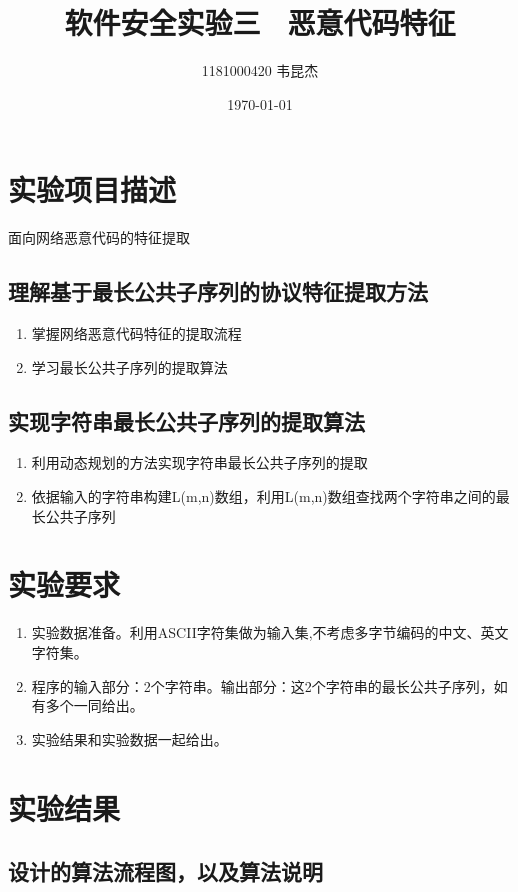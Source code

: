 \documentclass{ctexart}
\title{软件安全实验三 \ 恶意代码特征 }
\author{1181000420 韦昆杰}
\date{\today}
\begin{document}
\maketitle
\tableofcontents
\newpage

\section{实验项目描述}
面向网络恶意代码的特征提取

\subsection{理解基于最长公共子序列的协议特征提取方法}
\begin{enumerate}
  \item 掌握网络恶意代码特征的提取流程
  \item 学习最长公共子序列的提取算法
\end{enumerate}

\subsection{实现字符串最长公共子序列的提取算法}
\begin{enumerate}
  \item 利用动态规划的方法实现字符串最长公共子序列的提取
  \item 依据输入的字符串构建L(m,n)数组，利用L(m,n)数组查找两个字符串之间的最长公共子序列
\end{enumerate}


\section{实验要求}
\begin{enumerate}
  \item 实验数据准备。利用ASCII字符集做为输入集,不考虑多字节编码的中文、英文字符集。
  \item 程序的输入部分：2个字符串。输出部分：这2个字符串的最长公共子序列，如有多个一同给出。
  \item 实验结果和实验数据一起给出。
\end{enumerate}

\section{实验结果}
\subsection{设计的算法流程图，以及算法说明}
\end{document}
